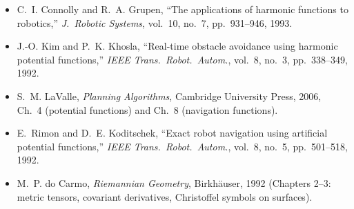 \documentclass[11pt]{article}
\begin{document}
\begin{itemize}
    \item C.~I. Connolly and R.~A. Grupen, ``The applications of
    harmonic functions to robotics,'' \emph{J.\ Robotic Systems},
    vol.~10, no.~7, pp.~931--946, 1993.
    \item J.-O. Kim and P.~K. Khosla, ``Real-time obstacle avoidance
    using harmonic potential functions,'' \emph{IEEE Trans.\ Robot.\
    Autom.}, vol.~8, no.~3, pp.~338--349, 1992.
    \item S.~M. LaValle, \emph{Planning Algorithms}, Cambridge
    University Press, 2006, Ch.~4 (potential functions) and Ch.~8
    (navigation functions).
    \item E.~Rimon and D.~E. Koditschek, ``Exact robot navigation
    using artificial potential functions,'' \emph{IEEE Trans.\ Robot.\
    Autom.}, vol.~8, no.~5, pp.~501--518, 1992.
    \item M.~P. do Carmo, \emph{Riemannian Geometry}, Birkh\"auser,
    1992 (Chapters 2--3: metric tensors, covariant derivatives,
    Christoffel symbols on surfaces).
\end{itemize}
\end{document}
